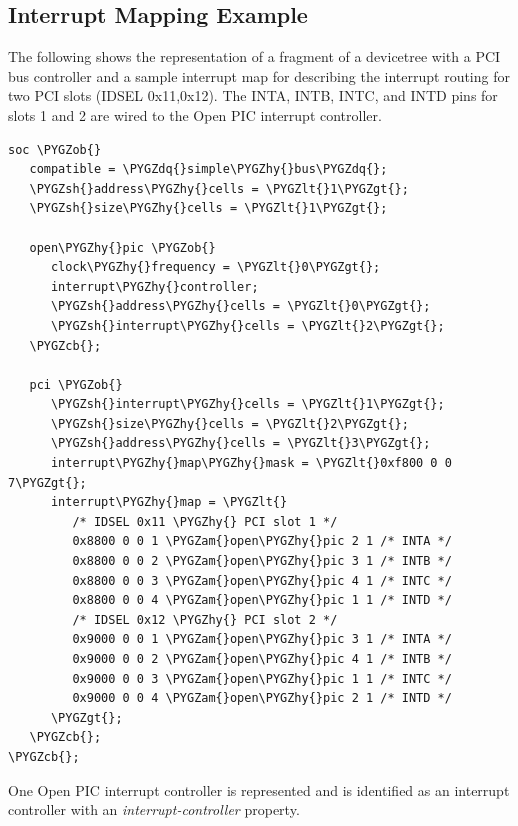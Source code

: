 \documentclass[a4paper,10pt,oneside]{sphinxmanual}
\def\PYGZob{\char`\{}
\def\PYGZcb{\char`\}}
\def\PYGZam{\char`\&}
\def\PYGZlt{\char`\<}
\def\PYGZgt{\char`\>}
\def\PYGZsh{\char`\#}
\def\PYGZhy{\char`\-}
\def\PYGZdq{\char`\"}
\begin{document}
\subsection{Interrupt Mapping Example}
\label{devicetree-basics:interrupt-mapping-example}
The following shows the representation of a fragment of a devicetree with
a PCI bus controller and a sample interrupt map for describing the
interrupt routing for two PCI slots (IDSEL 0x11,0x12). The INTA, INTB,
INTC, and INTD pins for slots 1 and 2 are wired to the Open PIC
interrupt controller.
\label{devicetree-basics:example-interrupt-mapping}
\def\SphinxLiteralBlockLabel{\label{devicetree-basics:example-interrupt-mapping}}
\begin{Verbatim}[commandchars=\\\{\}]
soc \PYGZob{}
   compatible = \PYGZdq{}simple\PYGZhy{}bus\PYGZdq{};
   \PYGZsh{}address\PYGZhy{}cells = \PYGZlt{}1\PYGZgt{};
   \PYGZsh{}size\PYGZhy{}cells = \PYGZlt{}1\PYGZgt{};

   open\PYGZhy{}pic \PYGZob{}
      clock\PYGZhy{}frequency = \PYGZlt{}0\PYGZgt{};
      interrupt\PYGZhy{}controller;
      \PYGZsh{}address\PYGZhy{}cells = \PYGZlt{}0\PYGZgt{};
      \PYGZsh{}interrupt\PYGZhy{}cells = \PYGZlt{}2\PYGZgt{};
   \PYGZcb{};

   pci \PYGZob{}
      \PYGZsh{}interrupt\PYGZhy{}cells = \PYGZlt{}1\PYGZgt{};
      \PYGZsh{}size\PYGZhy{}cells = \PYGZlt{}2\PYGZgt{};
      \PYGZsh{}address\PYGZhy{}cells = \PYGZlt{}3\PYGZgt{};
      interrupt\PYGZhy{}map\PYGZhy{}mask = \PYGZlt{}0xf800 0 0 7\PYGZgt{};
      interrupt\PYGZhy{}map = \PYGZlt{}
         /* IDSEL 0x11 \PYGZhy{} PCI slot 1 */
         0x8800 0 0 1 \PYGZam{}open\PYGZhy{}pic 2 1 /* INTA */
         0x8800 0 0 2 \PYGZam{}open\PYGZhy{}pic 3 1 /* INTB */
         0x8800 0 0 3 \PYGZam{}open\PYGZhy{}pic 4 1 /* INTC */
         0x8800 0 0 4 \PYGZam{}open\PYGZhy{}pic 1 1 /* INTD */
         /* IDSEL 0x12 \PYGZhy{} PCI slot 2 */
         0x9000 0 0 1 \PYGZam{}open\PYGZhy{}pic 3 1 /* INTA */
         0x9000 0 0 2 \PYGZam{}open\PYGZhy{}pic 4 1 /* INTB */
         0x9000 0 0 3 \PYGZam{}open\PYGZhy{}pic 1 1 /* INTC */
         0x9000 0 0 4 \PYGZam{}open\PYGZhy{}pic 2 1 /* INTD */
      \PYGZgt{};
   \PYGZcb{};
\PYGZcb{};
\end{Verbatim}
\let\SphinxLiteralBlockLabel\empty

One Open PIC interrupt controller is represented and is identified as an
interrupt controller with an \emph{interrupt-controller} property.
\end{document}
